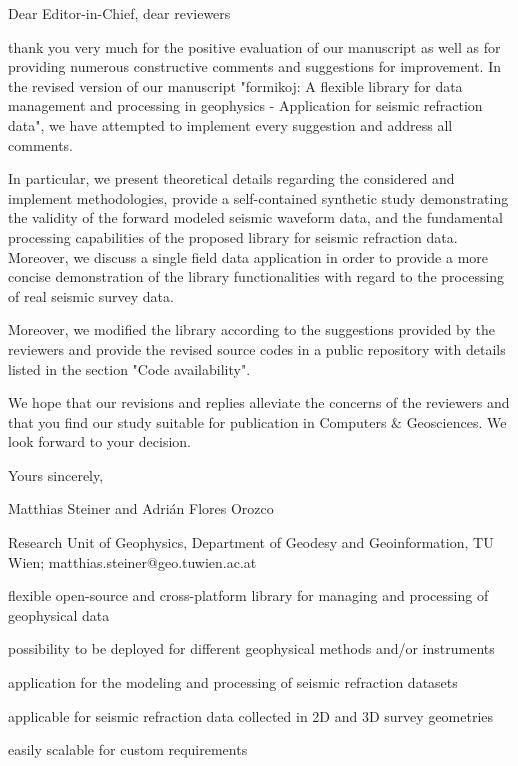 \documentclass[a4paper,fleqn]{cas-sc}
\begin{document}
\begin{coverletter}

Dear Editor-in-Chief, dear reviewers
\newline

thank you very much for the positive evaluation of our manuscript as well as for providing numerous constructive comments and suggestions for improvement. In the revised version of our manuscript "formikoj: A flexible library for data management and processing in geophysics - Application for seismic refraction data", we have attempted to implement every suggestion and address all comments. 
\newline
 
In particular, we present theoretical details regarding the considered and implement methodologies, provide a self-contained synthetic study demonstrating the validity of the forward modeled seismic waveform data, and the fundamental processing capabilities of the proposed library for seismic refraction data. Moreover, we discuss a single field data application in order to provide a more concise demonstration of the library functionalities with regard to the processing of real seismic survey data.
\newline

Moreover, we modified the library according to the suggestions provided by the reviewers and provide the revised source codes in a public repository with details listed in the section "Code availability".
\newline

We hope that our revisions and replies alleviate the concerns of the reviewers and that you find our study suitable for publication in Computers \& Geosciences. We look forward to your decision.
\newline

Yours sincerely,
\newline

Matthias Steiner and Adrián Flores Orozco

Research Unit of Geophysics, Department of Geodesy and Geoinformation, TU Wien; matthias.steiner@geo.tuwien.ac.at
\newline

\end{coverletter}
 
\begin{highlights}
\item flexible open-source and cross-platform library for managing and processing of geophysical data
\item possibility to be deployed for different geophysical methods and/or instruments
\item application for the modeling and processing of seismic refraction datasets
\item applicable for seismic refraction data collected in 2D and 3D survey geometries
\item easily scalable for custom requirements
\end{highlights}
\end{document}
